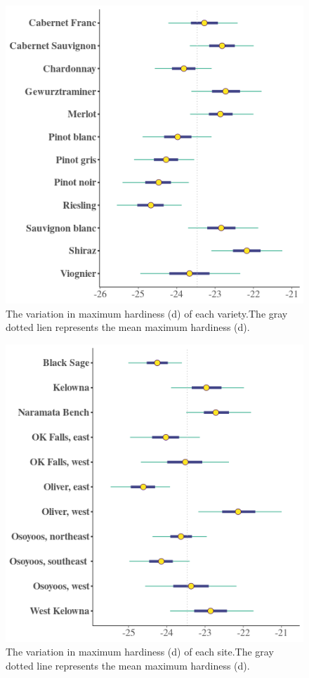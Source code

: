 \documentclass[11pt,letter]{article}
\begin{document}
\begin{figure}
  \includegraphics[scale = 0.75]{varDs.png}
  \caption{The variation in maximum hardiness (d) of each variety.The gray dotted lien represents the mean maximum hardiness (d).}
  \label{fig:varDs}
\end{figure}

\begin{figure}
  \includegraphics[scale = 0.75]{siteDs.png}
  \caption{The variation in maximum hardiness (d) of each site.The gray dotted line represents the mean maximum hardiness (d).}
  \label{fig:siteDs}
\end{figure}
\end{document}
